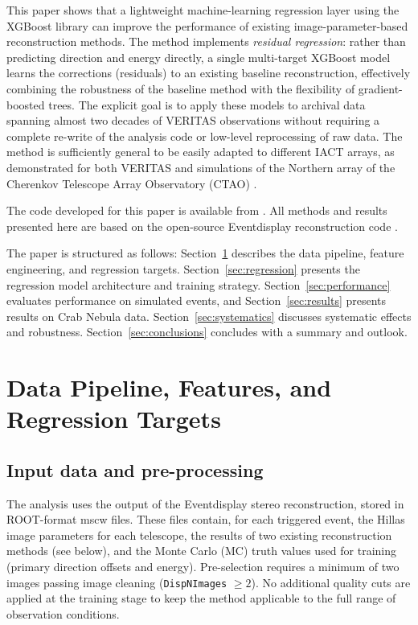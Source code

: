 \documentclass[12pt]{article}
\begin{document}
This paper shows that a lightweight machine-learning regression layer
using the XGBoost library \citep{Chen:2016:XST:2939672.2939785}
can improve the performance of existing image-parameter-based
reconstruction methods.
The method implements \textit{residual regression}: rather than predicting direction
and energy directly, a single multi-target XGBoost model learns the corrections
(residuals) to an existing baseline reconstruction, effectively combining the robustness
of the baseline method with the flexibility of gradient-boosted trees.
The explicit goal is to apply these models to archival data spanning almost two
decades of VERITAS \citep{2006APh....25..391H} observations
without requiring a complete re-write of the analysis code or low-level reprocessing
of raw data.
The method is sufficiently general to be easily adapted to different IACT arrays,
as demonstrated for both VERITAS and simulations of the Northern array of the Cherenkov Telescope Array Observatory (CTAO)
\citep{2019scta.book.....C}.

The code developed for this paper is available from \citep{maier_2026_18412988}.
All methods and results presented here are based on the open-source Eventdisplay reconstruction
code \citep{maier_2025_17447664,maier_2026_18412887}.

The paper is structured as follows:
Section~\ref{sec:features_and_targets} describes the data pipeline, feature engineering,
and regression targets.
Section~\ref{sec:regression} presents the regression model architecture and training strategy.
Section~\ref{sec:performance} evaluates performance on simulated events,
and Section~\ref{sec:results} presents results on Crab Nebula data.
Section~\ref{sec:systematics} discusses systematic effects and robustness.
Section~\ref{sec:conclusions} concludes with a summary and outlook.


\section{Data Pipeline, Features, and Regression Targets}
\label{sec:features_and_targets}

\subsection{Input data and pre-processing}

The analysis uses the output of the Eventdisplay stereo reconstruction,
stored in ROOT-format mscw files.
These files contain, for each triggered event, the
Hillas image parameters for each telescope, the results of two
existing reconstruction methods (see below), and the Monte Carlo (MC) truth values
used for training (primary direction offsets and energy).
Pre-selection requires a minimum of two images passing image cleaning
(\texttt{DispNImages} $\geq 2$).
No additional quality cuts are applied at the training stage to keep the
method applicable to the full range of observation conditions.
\end{document}
